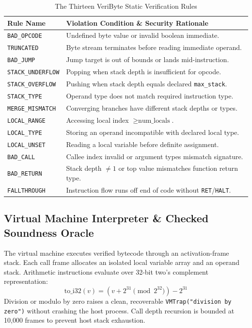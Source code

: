 \documentclass[conference]{IEEEtran}
\begin{document}
\begin{table}[htbp]
\caption{The Thirteen VeriByte Static Verification Rules}
\label{tab:rules}
\centering
\begin{tabular}{lp{6.2cm}}
\toprule
\textbf{Rule Name} & \textbf{Violation Condition \& Security Rationale} \\
\midrule
\texttt{BAD\_OPCODE} & Undefined byte value or invalid boolean immediate. \\
\texttt{TRUNCATED} & Byte stream terminates before reading immediate operand. \\
\texttt{BAD\_JUMP} & Jump target is out of bounds or lands mid-instruction. \\
\texttt{STACK\_UNDERFLOW} & Popping when stack depth is insufficient for opcode. \\
\texttt{STACK\_OVERFLOW} & Pushing when stack depth equals declared \texttt{max\_stack}. \\
\texttt{STACK\_TYPE} & Operand type does not match required instruction type. \\
\texttt{MERGE\_MISMATCH} & Converging branches have different stack depths or types. \\
\texttt{LOCAL\_RANGE} & Accessing local index $\ge \text{num\_locals}$. \\
\texttt{LOCAL\_TYPE} & Storing an operand incompatible with declared local type. \\
\texttt{LOCAL\_UNSET} & Reading a local variable before definite assignment. \\
\texttt{BAD\_CALL} & Callee index invalid or argument types mismatch signature. \\
\texttt{BAD\_RETURN} & Stack depth $\ne 1$ or top value mismatches function return type. \\
\texttt{FALLTHROUGH} & Instruction flow runs off end of code without \texttt{RET}/\texttt{HALT}. \\
\bottomrule
\end{tabular}
\end{table}

\subsection{Virtual Machine Interpreter \& Checked Soundness Oracle}
The virtual machine executes verified bytecode through an activation-frame stack. Each call frame allocates an isolated local variable array and an operand stack. Arithmetic instructions evaluate over 32-bit two's complement representation:
\begin{equation}
\text{to\_i32}(v) = (v + 2^{31} \pmod{2^{32}}) - 2^{31}
\end{equation}
Division or modulo by zero raises a clean, recoverable \texttt{VMTrap("division by zero")} without crashing the host process. Call depth recursion is bounded at 10,000 frames to prevent host stack exhaustion.
\end{document}
